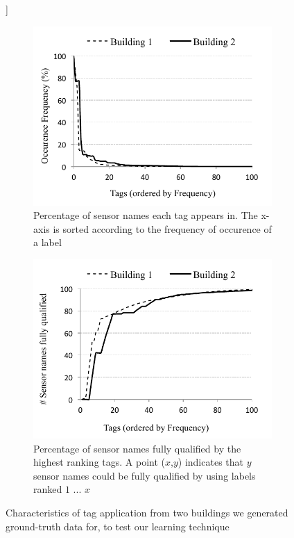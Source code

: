 \begin{figure}[h!]]
\centering
	\begin{subfigure}{0.48\textwidth}
                \centering
		\includegraphics[width=\textwidth]{./figs/pointOccuranceFreq.pdf}
                \caption{Percentage of sensor names each tag appears in. The x-axis is sorted according to the frequency of occurence of a label}
                \label{fig:labelFreq}
	\end{subfigure}
	\begin{subfigure}{0.48\textwidth}
                \centering
		\includegraphics[width=\textwidth]{./figs/pointCDF.pdf}
                \caption{Percentage of sensor names fully qualified by the highest ranking tags. A point ($x$,$y$) indicates that $y$ sensor names could be fully qualified by using labels ranked $1$ ... $x$}
                \label{fig:pointCDF}
	\end{subfigure}
\caption{Characteristics of tag application from two buildings we generated ground-truth data for, to test our learning technique}
\label{fig:buildingLabelCharacteristics}
\end{figure}


